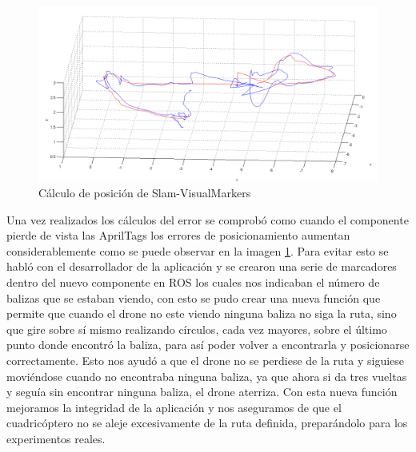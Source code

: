 \begin{figure}[H]
	\begin{center}
		\includegraphics[width=1\textwidth]{imag/IMG37.png}
				\caption{Cálculo de posición de Slam-VisualMarkers}
		\label{fig:Comparativa Slam-Visualmarkers.}	
	\end{center}
\end{figure}

\hspace{1cm} Una vez realizados los cálculos del error se comprobó como cuando el componente pierde de vista las AprilTags los errores de posicionamiento aumentan considerablemente como se puede observar en la imagen \ref{fig:Comparativa Slam-Visualmarkers.}. Para evitar esto se habló con el desarrollador de la aplicación y se crearon una serie de  marcadores dentro del nuevo componente en ROS los cuales nos indicaban el número de balizas que se estaban viendo, con esto se pudo crear una nueva función que permite que cuando el drone no este viendo ninguna baliza no siga la ruta, sino que gire sobre sí mismo realizando círculos, cada vez mayores, sobre el último punto donde encontró la baliza, para así poder volver a encontrarla y posicionarse correctamente. Esto nos ayudó a que el drone no se perdiese de la ruta y siguiese moviéndose cuando no encontraba ninguna baliza, ya que ahora si da tres vueltas y seguía sin encontrar ninguna baliza, el drone aterriza. Con esta nueva función mejoramos la integridad de la aplicación y nos aseguramos de que el cuadricóptero no se aleje excesivamente de la ruta definida, preparándolo para los experimentos reales.

